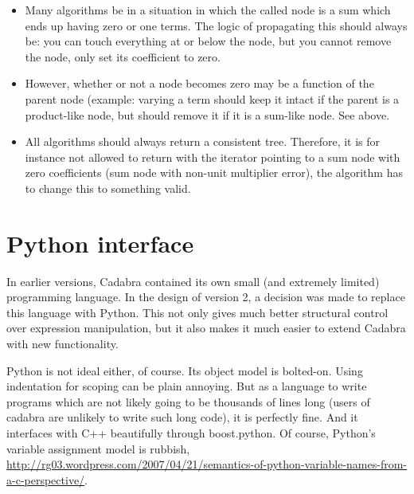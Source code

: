 \documentclass[11pt]{article}
\begin{document}
\begin{itemize}
\item Many algorithms be in a situation in which the called
  node is a sum which ends up having zero or one terms. The logic of
  propagating this should always be: you can touch everything at or
  below the node, but you cannot remove the node, only set its
  coefficient to zero. 

\item However, whether or not a node becomes zero may be a function of
  the parent node (example: varying a term should keep it intact if
  the parent is a product-like node, but should remove it if it is a
  sum-like node. See above.

\item All algorithms should always return a consistent
  tree. Therefore, it is for instance not allowed to return with the
  iterator pointing to a sum node with zero coefficients (sum node
  with non-unit multiplier error), the algorithm has to change this to
  something valid.

\end{itemize}


%

\section{Python interface}

In earlier versions, Cadabra contained its own small (and extremely
limited) programming language. In the design of version 2, a decision
was made to replace this language with Python. This not only gives
much better structural control over expression manipulation, but it
also makes it much easier to extend Cadabra with new functionality.

Python is not ideal either, of course. Its object model is bolted-on.
Using indentation for scoping can be plain annoying.  But as a
language to write programs which are not likely going to be thousands
of lines long (users of cadabra are unlikely to write such long code),
it is perfectly fine. And it interfaces with C++ beautifully through
boost.python. Of course, Python's variable assignment model is
rubbish,
\url{http://rg03.wordpress.com/2007/04/21/semantics-of-python-variable-names-from-a-c-perspective/}.
\end{document}
